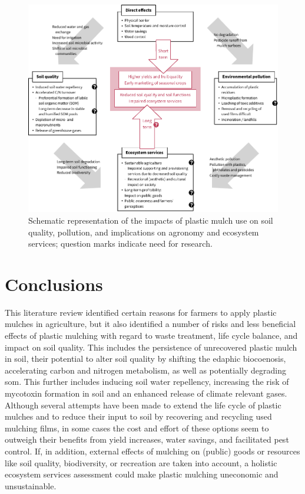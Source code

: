 \begin{figure}[t]
	\centering
	\label{fig:mulching-overview}
	\includegraphics[width=\textwidth]{figures/mulching-overview}
	\caption[Schematic representation of the impacts of plastic mulch use on soil quality, pollution, and implications on agronomy and ecosystem services.]{Schematic representation of the impacts of plastic mulch use on soil quality, pollution, and implications on agronomy and ecosystem services; question marks indicate need for research.}
\end{figure}

\section{Conclusions}
\label{sec:plastic-mulching:conclusions}

This literature review identified certain reasons for farmers to apply plastic mulches in agriculture, but it also identified a number of risks and less beneficial effects of plastic mulching with regard to waste treatment, life cycle balance, and impact on soil quality. This includes the persistence of unrecovered plastic mulch in soil, their potential to alter soil quality by shifting the edaphic biocoenosis, accelerating carbon and nitrogen metabolism, as well as potentially degrading \ac{som}. This further includes inducing soil water repellency, increasing the risk of mycotoxin formation in soil and an enhanced release of climate relevant gases. Although several attempts have been made to extend the life cycle of plastic mulches and to reduce their input to soil by recovering and recycling used mulching films, in some cases the cost and effort of these options seem to outweigh their benefits from yield increases, water savings, and facilitated pest control. If, in addition, external effects of mulching on (public) goods or resources like soil quality, biodiversity, or recreation are taken into account, a holistic ecosystem services assessment could make plastic mulching uneconomic and unsustainable.

